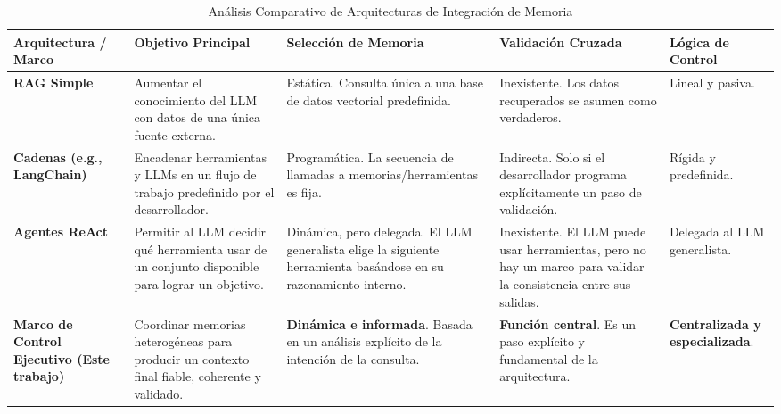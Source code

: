 \documentclass[conference]{IEEEtran}
\begin{document}
\begin{table*}[ht]
\centering
\caption{Análisis Comparativo de Arquitecturas de Integración de Memoria}
\label{tab:comparison}
\begin{tabularx}{\textwidth}{>{\bfseries}l X X X X}
\toprule
\textbf{Arquitectura / Marco} & \textbf{Objetivo Principal} & \textbf{Selección de Memoria} & \textbf{Validación Cruzada} & \textbf{Lógica de Control} \\
\midrule
\textbf{RAG Simple} & Aumentar el conocimiento del LLM con datos de una única fuente externa. & Estática. Consulta única a una base de datos vectorial predefinida. & Inexistente. Los datos recuperados se asumen como verdaderos. & Lineal y pasiva. \\
\addlinespace
\textbf{Cadenas (e.g., LangChain)} & Encadenar herramientas y LLMs en un flujo de trabajo predefinido por el desarrollador. & Programática. La secuencia de llamadas a memorias/herramientas es fija. & Indirecta. Solo si el desarrollador programa explícitamente un paso de validación. & Rígida y predefinida. \\
\addlinespace
\textbf{Agentes ReAct} & Permitir al LLM decidir qué herramienta usar de un conjunto disponible para lograr un objetivo. & Dinámica, pero delegada. El LLM generalista elige la siguiente herramienta basándose en su razonamiento interno. & Inexistente. El LLM puede usar herramientas, pero no hay un marco para validar la consistencia entre sus salidas. & Delegada al LLM generalista. \\
\addlinespace
\textbf{Marco de Control Ejecutivo (Este trabajo)} & Coordinar memorias heterogéneas para producir un contexto final fiable, coherente y validado. & \textbf{Dinámica e informada}. Basada en un análisis explícito de la intención de la consulta. & \textbf{Función central}. Es un paso explícito y fundamental de la arquitectura. & \textbf{Centralizada y especializada}. \\
\bottomrule
\end{tabularx}
\end{table*}
\end{document}
